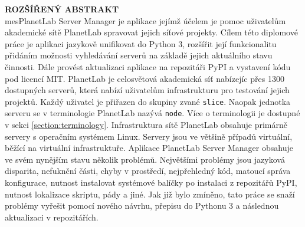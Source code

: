 \documentclass[%
  12pt,       				%
  a4paper,    				%
	unicode,						%
]{report}				    	%
\begin{document}
\cleardoublepage
\noindent
{\large\sffamily\bfseries\MakeUppercase{Rozšířený abstrakt}}
\\
mesPlanetLab Server Manager je aplikace jejímž účelem je pomoc uživatelům akademické sítě PlanetLab spravovat jejich síťové projekty. Cílem této diplomové práce je aplikaci jazykově unifikovat do Python 3, rozšířit její funkcionalitu přidáním možnosti vyhledávání serverů na základě jejich aktuálního stavu činnosti. Dále provést aktualizaci aplikace na repozitáři PyPI a vystavení kódu pod licencí MIT. PlanetLab je celosvětová akademická síť nabízejíc přes 1300 dostupných serverů, která nabízí uživatelům infrastrukturu pro testování jejich projektů. Každý uživatel je přiřazen do skupiny zvané \texttt{slice}. Naopak jednotka serveru se v terminologie PlanetLab nazývá \texttt{node}. Více o terminologii je dostupné v sekci \ref{section:terminology}. Infrastruktura sítě PlanetLab obsahuje primárně servery s operačním systémem Linux. Servery jsou ve většině případů virtuální, běžící na virtuální infrastruktuře. Aplikace PlanetLab Server Manager obsahuje ve svém nynějším stavu několik problémů. Největšími problémy jsou jazyková disparita, nefuknční části, chyby v prostředí, nejpřehledný kód, matoucí správa konfigurace, nutnost instalovat systémové balíčky po instalaci z repozitářů PyPI, nutnost lokalizace skriptu, pády a jiné. Jak již bylo zmíněno, tato práce se snaží problémy vyřešit pomocí nového návrhu, přepisu do Pythonu 3 a následnou aktualizaci v repozitářích.
\end{document}
